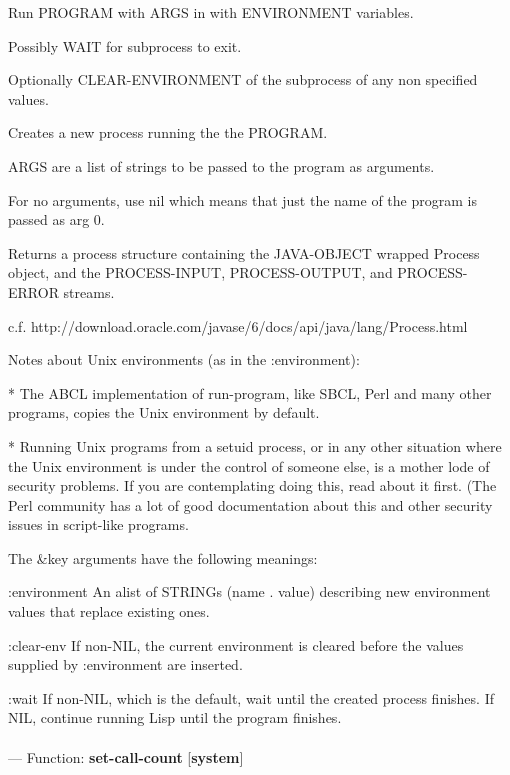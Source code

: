 \begin{adjustwidth}{5em}{5em}
Run PROGRAM with ARGS in with ENVIRONMENT variables.

Possibly WAIT for subprocess to exit.

Optionally CLEAR-ENVIRONMENT of the subprocess of any non specified values.

Creates a new process running the the PROGRAM.

ARGS are a list of strings to be passed to the program as arguments. 

For no arguments, use nil which means that just the name of the
program is passed as arg 0.

Returns a process structure containing the JAVA-OBJECT wrapped Process
object, and the PROCESS-INPUT, PROCESS-OUTPUT, and PROCESS-ERROR streams.

c.f. http://download.oracle.com/javase/6/docs/api/java/lang/Process.html

Notes about Unix environments (as in the :environment):

    * The ABCL implementation of run-program, like SBCL, Perl and many
      other programs, copies the Unix environment by default.

    * Running Unix programs from a setuid process, or in any other
      situation where the Unix environment is under the control of
      someone else, is a mother lode of security problems. If you are
      contemplating doing this, read about it first. (The Perl
      community has a lot of good documentation about this and other
      security issues in script-like programs.

The \&key arguments have the following meanings:

:environment 
    An alist of STRINGs (name . value) describing new
    environment values that replace existing ones.

:clear-env
    If non-NIL, the current environment is cleared before the
    values supplied by :environment are inserted.

:wait 
    If non-NIL, which is the default, wait until the created process
    finishes. If NIL, continue running Lisp until the program
    finishes.

\end{adjustwidth}

\paragraph{}
\label{SYSTEM:SET-CALL-COUNT}
--- Function: \textbf{set-call-count} [\textbf{system}] \textit{}

